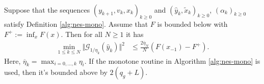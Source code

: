 \documentclass[12pt]{report}
\begin{document}
        \begin{theorem}\;\label{thm:nes-mono-wcnvx-convergence}\\
            Suppose that the sequences $(y_{k + 1}, v_k, x_k)_{k \ge 0}$ and $(\hat y_k, \tilde x_k)_{k \ge 0}$, $(\alpha_k)_{k \ge 0}$ satisfy Definition \ref{alg:nes-mono}. 
            Assume that $F$ is bounded below with $F^+ := \inf_{x}F(x)$. 
            Then for all $N \ge 1$ it has
            \begin{align*}
                \min_{1 \le k \le N}\Vert \mathcal G_{1/\eta_k}(\hat y_k) \Vert^2 
                &\le\frac{2\overline \eta_N}{N}(F(x_{-1}) - F^+). 
            \end{align*}
            Here, $\overline \eta_k = \max_{i = 0, \ldots, k}\eta_i$. 
            If the monotone routine in Algorithm \ref{alg:nes-mono} is used, then it's bounded above by $2(q_g + L)$. 
        \end{theorem}
\end{document}
